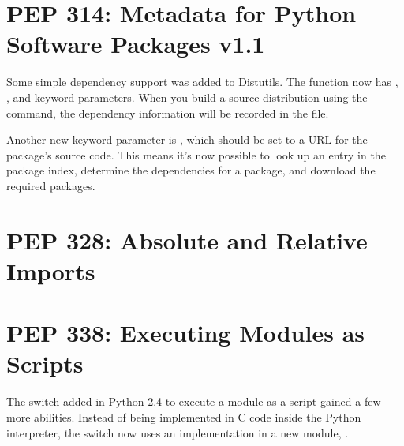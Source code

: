 \documentclass{howto}
\begin{document}
\begin{seealso}


\end{seealso}


\section{PEP 314: Metadata for Python Software Packages v1.1}

Some simple dependency support was added to Distutils.  The
 function now has , ,
and  keyword parameters.  When you build a source
distribution using the  command, the dependency
information will be recorded in the  file.

Another new keyword parameter is , which should be
set to a URL for the package's source code.  This means it's now
possible to look up an entry in the package index, determine the
dependencies for a package, and download the required packages.

 
\begin{seealso}


\end{seealso}


\section{PEP 328: Absolute and Relative Imports}



\section{PEP 338: Executing Modules as Scripts}

The  switch added in Python 2.4 to execute a module as
a script gained a few more abilities.  Instead of being implemented in
C code inside the Python interpreter, the switch now uses an
implementation in a new module, .
\end{document}
